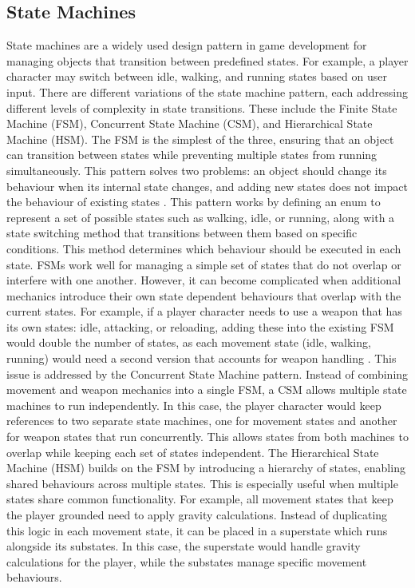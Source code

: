 \documentclass[10pt]{final_report}
\begin{document}
\subsection{State Machines}\label{HSM}
State machines are a widely used design pattern in game development for managing objects that transition between predefined states. For example, a player character may switch between idle, walking, and running states based on user input. There are different variations of the state machine pattern, each addressing different levels of complexity in state transitions. These include the Finite State Machine (FSM), Concurrent State Machine (CSM), and Hierarchical State Machine (HSM). The FSM is the simplest of the three, ensuring that an object can transition between states while preventing multiple states from running simultaneously. This pattern solves two problems: an object should change its behaviour when its internal state changes, and adding new states does not impact the behaviour of existing states \cite{unity2022_patterns}. This pattern works by defining an enum to represent a set of possible states such as walking, idle, or running, along with a state switching method that transitions between them based on specific conditions. This method determines which behaviour should be executed in each state. FSMs work well for managing a simple set of states that do not overlap or interfere with one another. However, it can become complicated when additional mechanics introduce their own state dependent behaviours that overlap with the current states. For example, if a player character needs to use a weapon that has its own states: idle, attacking, or reloading, adding these into the existing FSM would double the number of states, as each movement state (idle, walking, running) would need a second version that accounts for weapon handling \cite{nystrom2011game}. \newline
This issue is addressed by the Concurrent State Machine pattern. Instead of combining movement and weapon mechanics into a single FSM, a CSM allows multiple state machines to run independently. In this case, the player character would keep references to two separate state machines, one for movement states and another for weapon states that run concurrently. This allows states from both machines to overlap while keeping each set of states independent.
The Hierarchical State Machine (HSM) builds on the FSM by introducing a hierarchy of states, enabling shared behaviours across multiple states. This is especially useful when multiple states share common functionality. For example, all movement states that keep the player grounded need to apply gravity calculations. Instead of duplicating this logic in each movement state, it can be placed in a superstate which runs alongside its substates. In this case, the superstate would handle gravity calculations for the player, while the substates manage specific movement behaviours. 
\end{document}

